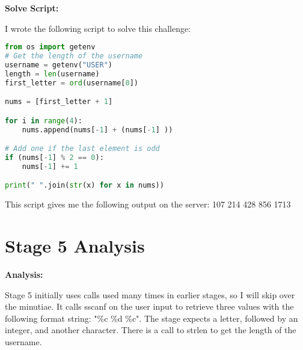\documentclass{article}
\begin{document}
\begin{flushleft}
\textbf{Solve Script:}
\vspace{.5pc}
\end{flushleft}
\par
I wrote the following script to solve this challenge:
\begin{lstlisting}[language=Python]
from os import getenv
# Get the length of the username
username = getenv("USER")
length = len(username)
first_letter = ord(username[0])

nums = [first_letter + 1]

for i in range(4):
    nums.append(nums[-1] + (nums[-1] ))

# Add one if the last element is odd
if (nums[-1] % 2 == 0):
    nums[-1] += 1

print(" ".join(str(x) for x in nums))
\end{lstlisting}
\par
This script gives me the following output on the server: 107 214 428 856 1713

\newpage
\section{Stage 5 Analysis}
\begin{flushleft}
\vspace{.5pc}
\end{flushleft}

\begin{flushleft}
\textbf{Analysis:}
\vspace{.5pc}
\end{flushleft}
\par
Stage 5 initially uses calls used many times in earlier stages, so I will 
skip over the minutiae.  It calls sscanf on the user input to retrieve three 
values with the following format string: "\%c \%d \%c".  The stage expects
a letter, followed by an integer, and another character.  There is a call to 
strlen to get the length of the username.  
\end{document}
